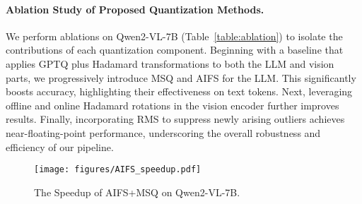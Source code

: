 \begin{table}[h]
\caption{Ablation study of proposed quantization designs on Qwen2-VL-7B~\cite{Qwen2VL} with W4A8 setting.}
\vspace{-2mm}
\label{table:ablation}
\centering
\Huge
{}
\vspace{-7mm}
\end{table}

\paragraph{Ablation Study of Proposed Quantization Methods.}
We perform ablations on Qwen2-VL-7B (Table~\ref{table:ablation}) to isolate the contributions of each quantization component. Beginning with a baseline that applies GPTQ plus Hadamard transformations to both the LLM and vision parts, we progressively introduce MSQ and AIFS for the LLM. This significantly boosts accuracy, highlighting their effectiveness on text tokens. Next, leveraging offline and online Hadamard rotations in the vision encoder further improves results. Finally, incorporating RMS to suppress newly arising outliers achieves near-floating-point performance, underscoring the overall robustness and efficiency of our pipeline.

\begin{figure}[h]
\vspace{-3mm}
    \centering    \texttt{[image: figures/AIFS\_speedup.pdf]}
    \vspace{-2mm}
    \caption{The Speedup of AIFS+MSQ on Qwen2-VL-7B.}
    \label{fig:AIFS_speed}
\vspace{-6mm}
\end{figure}

